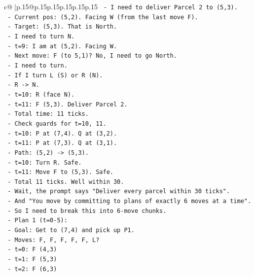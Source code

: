 \documentclass{article}
\begin{document}
{\begin{supertabular}{c@{$\;$}|p{.15\linewidth}@{}p{.15\linewidth}p{.15\linewidth}p{.15\linewidth}p{.15\linewidth}p{.15\linewidth}}
{{{\texttt{        {-} I need to deliver Parcel 2 to (5,3).} \\
\texttt{        {-} Current pos: (5,2). Facing W (from the last move F).} \\
\texttt{        {-} Target: (5,3). That is North.} \\
\texttt{        {-} I need to turn N.} \\
\texttt{        {-} t=9: I am at (5,2). Facing W.} \\
\texttt{        {-} Next move: F (to 5,1)? No, I need to go North.} \\
\texttt{        {-} I need to turn.} \\
\texttt{        {-} If I turn L (S) or R (N).} \\
\texttt{        {-} R {-}> N.} \\
\texttt{        {-} t=10: R (face N).} \\
\texttt{        {-} t=11: F (5,3). Deliver Parcel 2.} \\
\texttt{        {-} Total time: 11 ticks.} \\
\texttt{        {-} Check guards for t=10, 11.} \\
\texttt{        {-} t=10: P at (7,4). Q at (3,2).} \\
\texttt{        {-} t=11: P at (7,3). Q at (3,1).} \\
\texttt{        {-} Path: (5,2) {-}> (5,3).} \\
\texttt{        {-} t=10: Turn R. Safe.} \\
\texttt{        {-} t=11: Move F to (5,3). Safe.} \\
\texttt{        {-} Total 11 ticks. Well within 30.} \\
\texttt{        {-} Wait, the prompt says "Deliver every parcel within 30 ticks".} \\
\texttt{        {-} And "You move by committing to plans of exactly 6 moves at a time".} \\
\texttt{        {-} So I need to break this into 6{-}move chunks.} \\
\texttt{        {-} Plan 1 (t=0{-}5):} \\
\texttt{          {-} Goal: Get to (7,4) and pick up P1.} \\
\texttt{          {-} Moves: F, F, F, F, F, L?} \\
\texttt{          {-} t=0: F (4,3)} \\
\texttt{          {-} t=1: F (5,3)} \\
\texttt{          {-} t=2: F (6,3)} \\
}}}
\end{supertabular}}
\end{document}
